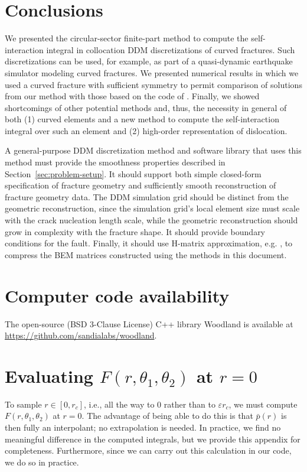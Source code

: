 \documentclass[11pt]{article}
\newcommand{\rmax}{r_c}
\begin{document}
\section{Conclusions} \label{sec:conclusions}

We presented the circular-sector finite-part method to compute the self-interaction integral
in collocation DDM discretizations of curved fractures.
Such discretizations can be used, for example,
as part of a quasi-dynamic earthquake simulator modeling curved fractures.
We presented numerical results in which
we used a curved fracture with sufficient symmetry
to permit comparison of solutions from our method
with those based on the code of \citet{okada1992internal}.
Finally, we showed shortcomings of other potential methods and,
thus, the necessity in general of both
(1) curved elements and a new method to compute the self-interaction integral over such an element and
(2) high-order representation of dislocation.

A general-purpose DDM discretization method and software library
that uses this method must provide the smoothness properties described in Section~\ref{sec:problem-setup}.
It should support both simple closed-form specification of fracture geometry
and sufficiently smooth reconstruction of fracture geometry data.
The DDM simulation grid should be distinct from the geometric reconstruction,
since the simulation grid's local element size must scale with the crack nucleation length scale,
while the geometric reconstruction should grow in complexity with the fracture shape.
It should provide boundary conditions for the fault.
Finally, it should use H-matrix approximation, e.g. \citet{bradley2014software},
to compress the BEM matrices constructed using the methods in this document.

\section*{Computer code availability}

The open-source (BSD 3-Clause License) C++ library Woodland \citep{woodland-software}
is available at \url{https://github.com/sandialabs/woodland}.

\appendix
\section{Evaluating $F(r,\theta_1,\theta_2)$ at $r=0$} \label{sec:Fr0}

To sample $r \in [0, \rmax]$, i.e., all the way to 0 rather than to $\varepsilon \rmax$,
we must compute $F(r,\theta_1,\theta_2)$ at $r=0$.
The advantage of being able to do this is that $\bar{p}(r)$ is then fully an interpolant;
no extrapolation is needed.
In practice, we find no meaningful difference in the computed integrals,
but we provide this appendix for completeness.
Furthermore, since we can carry out this calculation in our code,
we do so in practice.
\end{document}
